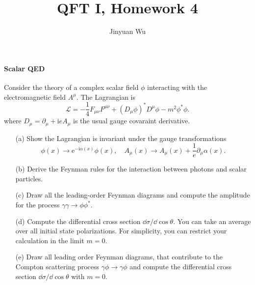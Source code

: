 \documentclass[hyperref, a4paper]{article}
\title{QFT I, Homework 4}
\author{Jinyuan Wu}
\newcommand*{\ii}{\mathrm{i}}
\newcommand*{\ee}{\mathrm{e}}
\begin{document}
\maketitle

\paragraph{Scalar QED} Consider the theory of a complex scalar field $\phi$ interacting with the electromagnetic field $A^{\mu}$. The Lagrangian is
\begin{equation}
    \mathcal{L}=-\frac{1}{4} F_{\mu \nu} F^{\mu \nu}+\left(D_{\mu} \phi\right)^{*} D^{\mu} \phi-m^{2} \phi^{*} \phi.
    \label{eq:scalar-qed}
\end{equation}
where $D_{\mu}=\partial_{\mu}+ \ii e A_{\mu}$ is the usual gauge covaraint derivative.
\begin{itemize}
    \item[(a)] Show the Lagrangian is invariant under the gauge transformations
    \begin{equation}
        \phi(x) \rightarrow \ee^{-\ii \alpha(x)} \phi(x), \quad A_{\mu}(x) \rightarrow A_{\mu}(x)+\frac{1}{e} \partial_{\mu} \alpha(x).
        \label{eq:gauge}
    \end{equation}
    \item[(b)] Derive the Feynman rules for the interaction between photons and scalar particles.
    \item[(c)] Draw all the leading-order Feynman diagrams and compute the amplitude for the process $\gamma \gamma \rightarrow \phi \phi^{*}$.
    \item[(d)] Compute the differential cross section $\dd \sigma / \dd \cos \theta$. You can take an average over all initial state polarizations. For simplicity, you can restrict your calculation in the limit $m=0$.
    \item[(e)] Draw all leading order Feynman diagrams, that contribute to the Compton scattering process $\gamma \phi \rightarrow \gamma \phi$ and compute the differential cross section $\dd \sigma / \dd \cos \theta$ with $m=0$.
\end{itemize}
\end{document}

